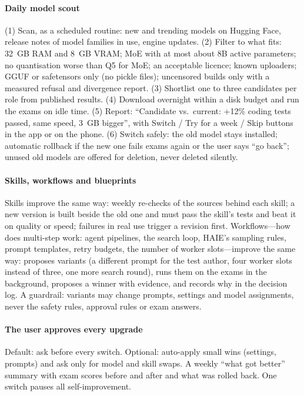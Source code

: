 \paragraph{Daily model scout} (1) Scan, as a scheduled routine: new and trending models on Hugging Face, release notes of model families in use, engine updates. (2) Filter to what fits: 32~GB RAM and 8~GB VRAM; MoE with at most about 8B active parameters; no quantisation worse than Q5 for MoE; an acceptable licence; known uploaders; GGUF or safetensors only (no pickle files); uncensored builds only with a measured refusal and divergence report. (3) Shortlist one to three candidates per role from published results. (4) Download overnight within a disk budget and run the exams on idle time. (5) Report: ``Candidate vs.\ current: +12\% coding tests passed, same speed, 3~GB bigger'', with Switch / Try for a week / Skip buttons in the app or on the phone. (6) Switch safely: the old model stays installed; automatic rollback if the new one fails exams again or the user says ``go back''; unused old models are offered for deletion, never deleted silently.

\paragraph{Skills, workflows and blueprints} Skills improve the same way: weekly re-checks of the sources behind each skill; a new version is built beside the old one and must pass the skill's tests and beat it on quality or speed; failures in real use trigger a revision first. Workflows---how \hivi{} does multi-step work: agent pipelines, the search loop, HAIE's sampling rules, prompt templates, retry budgets, the number of worker slots---improve the same way: \hivi{} proposes variants (a different prompt for the test author, four worker slots instead of three, one more search round), runs them on the exams in the background, proposes a winner with evidence, and records why in the decision log. A guardrail: variants may change prompts, settings and model assignments, never the safety rules, approval rules or exam answers.

\paragraph{The user approves every upgrade} Default: ask before every switch. Optional: auto-apply small wins (settings, prompts) and ask only for model and skill swaps. A weekly ``what got better'' summary with exam scores before and after and what was rolled back. One switch pauses all self-improvement.

